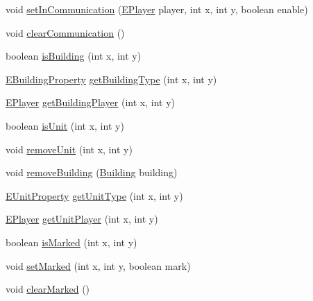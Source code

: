 \begin{DoxyCompactItemize}
\item 
void \mbox{\hyperlink{classgame_1_1game_state_1_1_game_state_a4e627b92bbb28941616c628ae393baa6}{set\+In\+Communication}} (\mbox{\hyperlink{enumgame_1_1_e_player}{E\+Player}} player, int x, int y, boolean enable)
\item 
void \mbox{\hyperlink{classgame_1_1game_state_1_1_game_state_a41a6717791a72572de33f8e4fe2b956a}{clear\+Communication}} ()
\item 
boolean \mbox{\hyperlink{classgame_1_1game_state_1_1_game_state_af6886fabf0eb529d7bda218d46d45ae7}{is\+Building}} (int x, int y)
\item 
\mbox{\hyperlink{enumrule_engine_1_1entity_1_1_e_building_property}{E\+Building\+Property}} \mbox{\hyperlink{classgame_1_1game_state_1_1_game_state_a2d95887f3ee78109ddcb0b27b6a8ec93}{get\+Building\+Type}} (int x, int y)
\item 
\mbox{\hyperlink{enumgame_1_1_e_player}{E\+Player}} \mbox{\hyperlink{classgame_1_1game_state_1_1_game_state_a25ae413bd0f2d04b162673431975ec8f}{get\+Building\+Player}} (int x, int y)
\item 
boolean \mbox{\hyperlink{classgame_1_1game_state_1_1_game_state_aa00899823d9599e053902598707f2bae}{is\+Unit}} (int x, int y)
\item 
void \mbox{\hyperlink{classgame_1_1game_state_1_1_game_state_a671269ff7143ada95e467bc922be519e}{remove\+Unit}} (int x, int y)
\item 
void \mbox{\hyperlink{classgame_1_1game_state_1_1_game_state_ac1a1d226c2aee2ff606c94ec1f2d2243}{remove\+Building}} (\mbox{\hyperlink{classgame_1_1board_1_1_building}{Building}} building)
\item 
\mbox{\hyperlink{enumrule_engine_1_1entity_1_1_e_unit_property}{E\+Unit\+Property}} \mbox{\hyperlink{classgame_1_1game_state_1_1_game_state_aab7480b446f4745f84e9a8831692a472}{get\+Unit\+Type}} (int x, int y)
\item 
\mbox{\hyperlink{enumgame_1_1_e_player}{E\+Player}} \mbox{\hyperlink{classgame_1_1game_state_1_1_game_state_a270d806134a05500cc970ced6bee81bc}{get\+Unit\+Player}} (int x, int y)
\item 
boolean \mbox{\hyperlink{classgame_1_1game_state_1_1_game_state_abfb97afaa4914330a9df6db34e0ae323}{is\+Marked}} (int x, int y)
\item 
void \mbox{\hyperlink{classgame_1_1game_state_1_1_game_state_a2b96db554e56b41714d9ff4cffed5fbc}{set\+Marked}} (int x, int y, boolean mark)
\item 
void \mbox{\hyperlink{classgame_1_1game_state_1_1_game_state_a8d1aba23400ae5b7cbd54af6514c83cc}{clear\+Marked}} ()

\end{DoxyCompactItemize}
